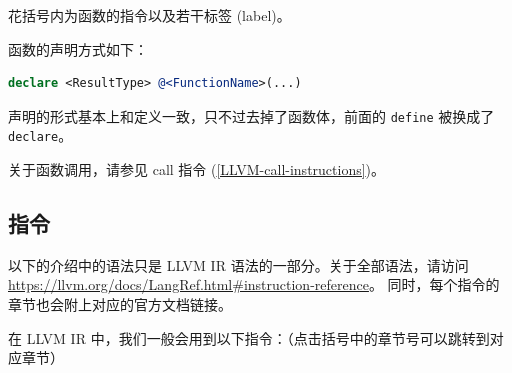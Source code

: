 花括号内为函数的指令以及若干标签 (label)。

函数的声明方式如下：

\begin{lstlisting}[language=llvm]
declare <ResultType> @<FunctionName>(...)
\end{lstlisting}

声明的形式基本上和定义一致，只不过去掉了函数体，前面的 \texttt{define} 被换成了
\texttt{declare}。

\begin{remark}
关于函数调用，请参见 call 指令 (\ref{LLVM-call-instructions})。
\end{remark}

\subsection{指令}\label{LLVM-instructions}

\begin{remark}
以下的介绍中的语法只是 LLVM IR 语法的一部分。关于全部语法，请访问
\url{https://llvm.org/docs/LangRef.html\#instruction-reference}。
同时，每个指令的章节也会附上对应的官方文档链接。
\end{remark}

在 LLVM IR 中，我们一般会用到以下指令：（点击括号中的章节号可以跳转到对应章节）

